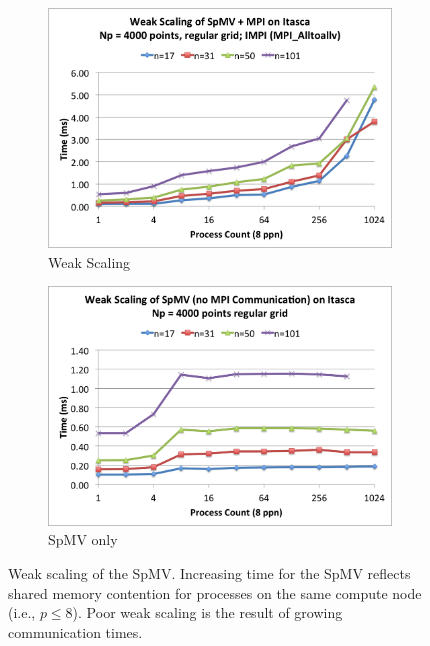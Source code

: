 \documentclass{report}
\begin{document}
\begin{figure}
\centering
\begin{subfigure}{0.48\textwidth}
\centering
\includegraphics[width=\textwidth]{performance_content/scaling/weak_scaling_np4000_regular_alltoallv.png}
\caption{Weak Scaling}
\label{fig:weak_scaling_alltoallv_all_stencils}
\end{subfigure}
\begin{subfigure}{0.48\textwidth}
\centering
\includegraphics[width=\textwidth]{performance_content/scaling/weak_scaling_np4000_regular_spmvOnly.png}
\caption{SpMV only}
\label{fig:weak_scaling_spmv_only_alltoallv_all_stencils}
\end{subfigure}
\caption{Weak scaling of the SpMV. Increasing time for the SpMV reflects shared memory contention for processes on the same compute node (i.e., $p\leq 8$). Poor weak scaling is the result of growing communication times. }
\end{figure}
\end{document}
